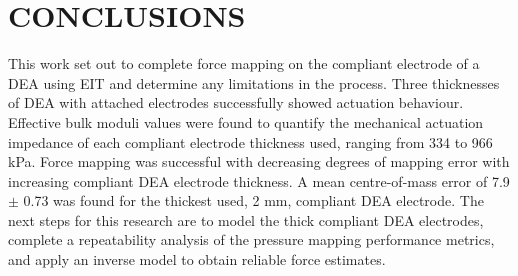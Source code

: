 	
	\section{CONCLUSIONS}
	\label{sec:concs}
    This work set out to complete force mapping on the compliant electrode of a DEA using EIT and determine any limitations in the process. Three thicknesses of DEA with attached electrodes successfully showed actuation behaviour. Effective bulk moduli values were found to quantify the mechanical actuation impedance of each compliant electrode thickness used, ranging from 334 to 966 kPa. Force mapping was successful with decreasing degrees of mapping error with increasing compliant DEA electrode thickness. A mean centre-of-mass error of 7.9 $\pm$ 0.73 was found for the thickest used, 2 mm, compliant DEA electrode. The next steps for this research are to model the thick compliant DEA electrodes, complete a repeatability analysis of the pressure mapping performance metrics, and apply an inverse model to obtain reliable force estimates.